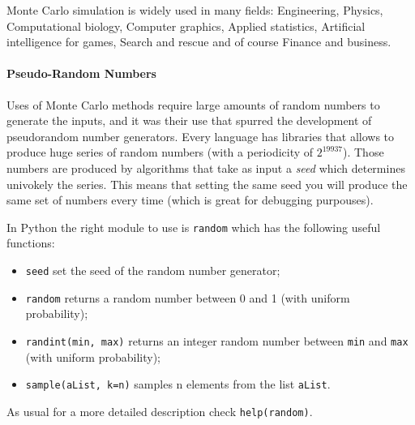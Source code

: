 \documentclass[11pt]{article}
\providecommand{\tightlist}{%
      \setlength{\itemsep}{0pt}\setlength{\parskip}{0pt}}
\begin{document}
Monte Carlo simulation is widely used in many fields: Engineering,
Physics, Computational biology, Computer graphics, Applied statistics,
Artificial intelligence for games, Search and rescue and of course
Finance and business.

    \hypertarget{pseudo-random-numbers}{%
\paragraph{Pseudo-Random Numbers}\label{pseudo-random-numbers}}

Uses of Monte Carlo methods require large amounts of random numbers to
generate the inputs, and it was their use that spurred the development
of pseudorandom number generators. Every language has libraries that
allows to produce huge series of random numbers (with a periodicity of
\(2^{19937}\)). Those numbers are produced by algorithms that take as
input a \emph{seed} which determines univokely the series. This means
that setting the same seed you will produce the same set of numbers
every time (which is great for debugging purpouses).

In Python the right module to use is \texttt{random} which has the
following useful functions:

\begin{itemize}
\tightlist
\item
  \texttt{seed} set the seed of the random number generator;
\item
  \texttt{random} returns a random number between 0 and 1 (with uniform
  probability);
\item
  \texttt{randint(min,\ max)} returns an integer random number between
  \texttt{min} and \texttt{max} (with uniform probability);
\item
  \texttt{sample(aList,\ k=n)} samples n elements from the list
  \texttt{aList}.
\end{itemize}

As usual for a more detailed description check \texttt{help(random)}.
\end{document}
